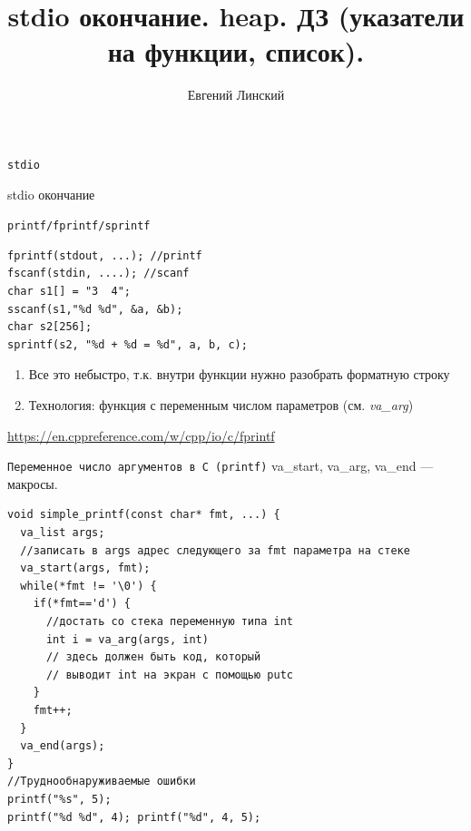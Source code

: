 \documentclass[pdf, 10pt, unicode]{beamer}
\title{stdio окончание. heap. ДЗ (указатели на функции, список).}
\author{Евгений Линский}
\date{}
\begin{document}
\begin{frame}
  \vspace{1cm}
  \large
  \maketitle
  \thispagestyle{empty}
  \vspace{1cm}
  \date{}
\end{frame}

\begin{frame}[fragile]{{\tt stdio}}
\begin{center}
\begin{huge}stdio окончание\end{huge}
\end{center}
\end{frame}


\begin{frame}[fragile]{{\tt printf/fprintf/sprintf}}
\begin{lstlisting}
fprintf(stdout, ...); //printf
fscanf(stdin, ....); //scanf
char s1[] = "3  4";
sscanf(s1,"%d %d", &a, &b);
char s2[256];
sprintf(s2, "%d + %d = %d", a, b, c);
\end{lstlisting}
\begin{enumerate}
  \item Все это небыстро, т.к. внутри функции нужно разобрать форматную строку
  \item Технология: функция с переменным числом параметров (см. \emph{va\_arg})
\end{enumerate}
\url{https://en.cppreference.com/w/cpp/io/c/fprintf}
\end{frame}


\begin{frame}[fragile]{{\tt Переменное число аргументов в C (printf)}}
va\_start, va\_arg, va\_end --- макросы.
\begin{verbatim}
void simple_printf(const char* fmt, ...) {
  va_list args;
  //записать в args адрес следующего за fmt параметра на стеке
  va_start(args, fmt);
  while(*fmt != '\0') {
    if(*fmt=='d') {
      //достать со стека переменную типа int
      int i = va_arg(args, int)
      // здесь должен быть код, который
      // выводит int на экран с помощью putc
    }
    fmt++;
  }
  va_end(args);
}
//Труднообнаруживаемые ошибки
printf("%s", 5);
printf("%d %d", 4); printf("%d", 4, 5);
\end{verbatim}

\end{frame}
\end{document}
